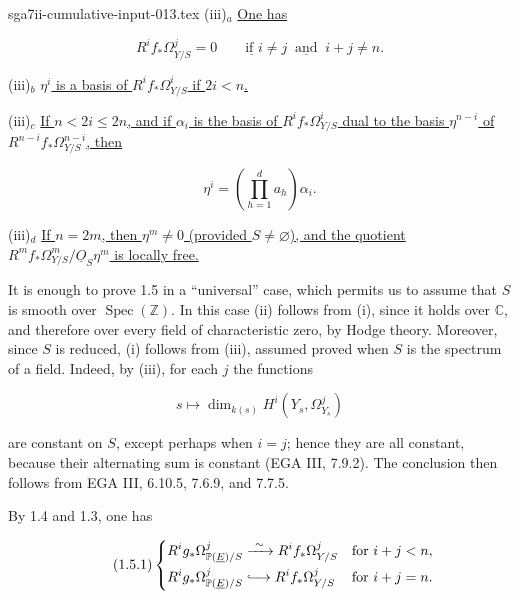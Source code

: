 \begin{filecontents*}{sga7ii-cumulative-input-013.tex}
\noindent(iii)$_a$ \underline{One has}

\begin{equation*}
R^if_*\Omega^j_{Y/S}=0
\qquad\underline{\text{if }}i\ne j\ \underline{\text{ and }}\ i+j\ne n.
\end{equation*}


\noindent(iii)$_b$ \underline{$\eta^i$ is a basis of
$R^if_*\Omega^i_{Y/S}$ if $2i<n$.}

\noindent(iii)$_c$ \underline{If $n<2i\leq2n$, and if $\alpha_i$ is the
basis of $R^if_*\Omega^i_{Y/S}$ dual to the basis $\eta^{n-i}$ of
$R^{n-i}f_*\Omega^{n-i}_{Y/S}$, then}

\begin{equation*}
\eta^i=\left(\prod_{h=1}^d a_h\right)\alpha_i.
\end{equation*}

\noindent(iii)$_d$ \underline{If $n=2m$, then $\eta^m\ne0$ (provided
$S\ne\varnothing$), and the quotient
$R^mf_*\Omega^m_{Y/S}/\underline O_S\eta^m$ is locally free.}

It is enough to prove 1.5 in a ``universal'' case, which permits us to
assume that $S$ is smooth over $\operatorname{Spec}(\mathbb Z)$.  In this
case (ii) follows from (i), since it holds over $\mathbb C$, and therefore
over every field of characteristic zero, by Hodge theory.  Moreover, since
$S$ is reduced, (i) follows from (iii), assumed proved when $S$ is the
spectrum of a field.  Indeed, by (iii), for each $j$ the functions

\begin{equation*}
s\longmapsto\dim_{k(s)}H^i(Y_s,\Omega^j_{Y_s})
\end{equation*}

are constant on $S$, except perhaps when $i=j$; hence they are all constant,
because their alternating sum is constant (EGA III, 7.9.2).  The conclusion
then follows from EGA III, 6.10.5, 7.6.9, and 7.7.5.

By 1.4 and 1.3, one has

\begin{equation}\tag{1.5.1}
\left\{
\begin{aligned}
R^ig_*\Omega^j_{\mathbb P(\underline E)/S}
&\xrightarrow{\ \sim\ }R^if_*\Omega^j_{Y/S}
&&\text{for }i+j<n,\\
R^ig_*\Omega^j_{\mathbb P(\underline E)/S}
&\lhook\joinrel\longrightarrow R^if_*\Omega^j_{Y/S}
&&\text{for }i+j=n.
\end{aligned}
\right.
\end{equation}


\end{filecontents*}
